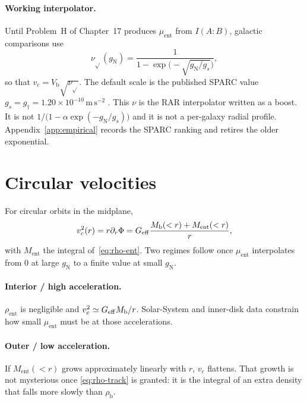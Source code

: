 \paragraph{Working interpolator.}
Until Problem~H of Chapter~17 produces
\(\mu_{\mathrm{ent}}\) from \(I(A:B)\), galactic comparisons use
\begin{equation}
  \label{eq:nu-sqrt}
  \nu_{\sqrt{}}(g_{\mathrm{N}})
  =\frac{1}{1-\exp\bigl(-\sqrt{g_{\mathrm{N}}/g_s}\bigr)},
\end{equation}
so that \(v_c=V_{\mathrm{b}}\sqrt{\nu_{\sqrt{}}}\). The default
scale is the published SPARC value
\(g_s=g_\dagger=1.20\times 10^{-10}\,\mathrm{m\,s^{-2}}\)
\cite{McGaugh2016}. This \(\nu\) is the RAR interpolator written
as a boost. It is not
\(1/\bigl(1-\alpha\exp(-g_{\mathrm{N}}/g_s)\bigr)\) and it is not
a per-galaxy radial profile. Appendix~\ref{app:empirical}
records the SPARC ranking and retires the older exponential.

\section{Circular velocities}
\label{sec:ch13-vc}

For circular orbits in the midplane,
\begin{equation}
  \label{eq:vc}
  v_c^2(r)
  =r\partial_r\Phi
  =G_{\mathrm{eff}}
   \frac{M_{\mathrm{b}}(<r)+M_{\mathrm{ent}}(<r)}{r},
\end{equation}
with \(M_{\mathrm{ent}}\) the integral of~\eqref{eq:rho-ent}. Two
regimes follow once \(\mu_{\mathrm{ent}}\) interpolates from \(0\)
at large \(g_{\mathrm{N}}\) to a finite value at small \(g_{\mathrm{N}}\).

\paragraph{Interior / high acceleration.}
\(\rho_{\mathrm{ent}}\) is negligible and \(v_c^2\simeq G_{\mathrm{eff}}
M_{\mathrm{b}}/r\). Solar-System and inner-disk data constrain how
small \(\mu_{\mathrm{ent}}\) must be at those accelerations.

\paragraph{Outer / low acceleration.}
If \(M_{\mathrm{ent}}(<r)\) grows approximately linearly with
\(r\), \(v_c\) flattens. That growth is not mysterious once
\eqref{eq:rho-track} is granted: it is the integral of an extra
density that falls more slowly than \(\rho_{\mathrm{b}}\).

